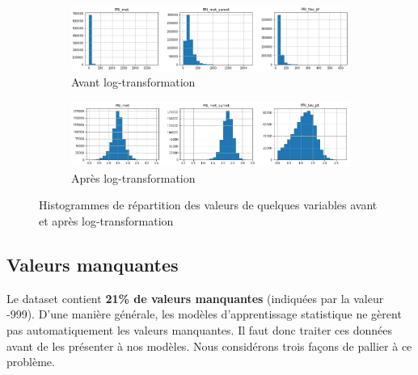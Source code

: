 \documentclass[12pt]{article}
\begin{document}
\begin{figure}[H]
	\centering
    \begin{subfigure}[c]{\textwidth}
        \includegraphics[width=\textwidth]{images/histograms_before_log.png}
    \caption{Avant log-transformation}
    \end{subfigure}

    \begin{subfigure}[c]{\textwidth}
        \includegraphics[width=\textwidth]{images/histograms_after_log.png}
    \caption{Après log-transformation}
    \end{subfigure}

    \caption{Histogrammes de répartition des valeurs de quelques variables avant
    et après log-transformation}
    \label{fig:hist-log}
\end{figure}



\subsection{Valeurs manquantes}

Le dataset contient \textbf{21\% de valeurs manquantes} (indiquées par la valeur
-999).  D’une manière générale, les modèles d’apprentissage statistique ne
gèrent pas automatiquement les valeurs manquantes. Il faut donc traiter ces
données avant de les présenter à nos modèles. Nous considérons trois façons de
pallier à ce problème.
\end{document}
